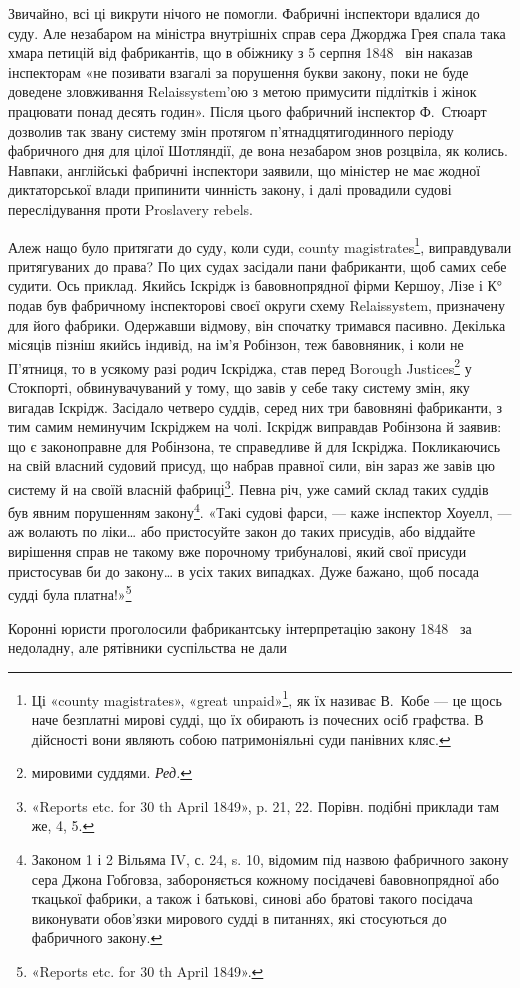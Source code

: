 
Звичайно, всі ці викрути нічого не помогли. Фабричні інспектори
вдалися до суду. Але незабаром на міністра внутрішніх
справ сера Джорджа Грея спала така хмара петицій від фабрикантів,
що в обіжнику з 5 серпня 1848~ він наказав інспекторам
«не позивати взагалі за порушення букви закону, поки не буде
доведене зловживання Relaissystem’ою з метою примусити підлітків
і жінок працювати понад десять годин». Після цього фабричний
інспектор Ф.~Стюарт дозволив так звану систему змін протягом
п’ятнадцятигодинного періоду фабричного дня для цілої Шотляндії,
де вона незабаром знов розцвіла, як колись. Навпаки,
англійські фабричні інспектори заявили, що міністер не має
жодної диктаторської влади припинити чинність закону, і далі
провадили судові переслідування проти Proslavery rebels.

Алеж нащо було притягати до суду, коли суди, county magistrates\footnote{
Ці «county magistrates», «great unpaid»\footnote*{величні неоплачувані.  \emph Ред. },
як їх називає В.~Кобе — це щось наче безплатні мирові судді, що їх обирають із почесних
осіб графства. В дійсності вони являють собою патримоніяльні суди панівних
кляс.
},
виправдували притягуваних до права? По цих судах
засідали пани фабриканти, щоб самих себе судити. Ось приклад.
Якийсь Іскрідж із бавовнопрядної фірми Кершоу, Лізе і К°
подав був фабричному інспекторові своєї округи схему Relaissystem,
призначену для його фабрики. Одержавши відмову,
він спочатку тримався пасивно. Декілька місяців пізніш якийсь
індивід, на ім’я Робінзон, теж бавовняник, і коли не П’ятниця,
то в усякому разі родич Іскріджа, став перед Borough Justices\footnote*{мировими суддями. \emph {Ред.}}
у Стокпорті, обвинувачуваний у тому, що завів у себе таку
систему змін, яку вигадав Іскрідж. Засідало четверо суддів,
серед них три бавовняні фабриканти, з тим самим неминучим
Іскріджем на чолі. Іскрідж виправдав Робінзона й заявив: що є
законоправне для Робінзона, те справедливе й для Іскріджа.
Покликаючись на свій власний судовий присуд, що набрав правної
сили, він зараз же завів цю систему й на своїй власній фабриці\footnote{
«Reports etc. for 30 th April 1849», p. 21, 22. Порівн. подібні
приклади там же, \stor{}4, 5.
}.
Певна річ, уже самий склад таких суддів був явним порушенням
закону\footnote{
Законом 1 і 2 Вільяма IV, с. 24, s. 10, відомим під назвою фабричного
закону сера Джона Гобговза, забороняється кожному посідачеві
бавовнопрядної або ткацької фабрики, а також і батькові, синові або
братові такого посідача виконувати обов'язки мирового судді в питаннях,
які стосуються до фабричного закону.
}. «Такі судові фарси, — каже інспектор Хоуелл, —
аж волають по ліки\dots{} або пристосуйте закон до таких присудів,
або віддайте вирішення справ не такому вже порочному трибуналові,
який свої присуди пристосував би до закону\dots{} в усіх таких
випадках. Дуже бажано, щоб посада судді була платна!»\footnote{
«Reports etc. for 30 th April 1849».
}

Коронні юристи проголосили фабрикантську інтерпретацію
закону 1848~ за недоладну, але рятівники суспільства не дали
\parbreak{}  %
